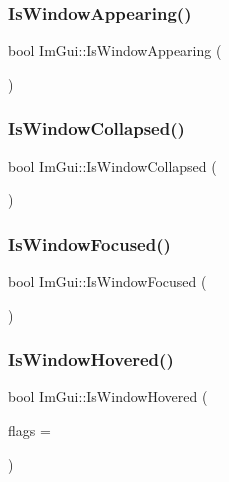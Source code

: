 \subsubsection{\texorpdfstring{Is\+Window\+Appearing()}{IsWindowAppearing()}}
{\footnotesize\ttfamily bool Im\+Gui\+::\+Is\+Window\+Appearing (\begin{DoxyParamCaption}{ }\end{DoxyParamCaption})}

\hypertarget{namespace_im_gui_a2a6492aea9013c0078fc530a66e11768}{}\label{namespace_im_gui_a2a6492aea9013c0078fc530a66e11768} 
\subsubsection{\texorpdfstring{Is\+Window\+Collapsed()}{IsWindowCollapsed()}}
{\footnotesize\ttfamily bool Im\+Gui\+::\+Is\+Window\+Collapsed (\begin{DoxyParamCaption}{ }\end{DoxyParamCaption})}

\hypertarget{namespace_im_gui_a1bc0d66039324e071c7d1ae20f9b1211}{}\label{namespace_im_gui_a1bc0d66039324e071c7d1ae20f9b1211} 
\subsubsection{\texorpdfstring{Is\+Window\+Focused()}{IsWindowFocused()}}
{\footnotesize\ttfamily bool Im\+Gui\+::\+Is\+Window\+Focused (\begin{DoxyParamCaption}{ }\end{DoxyParamCaption})}

\hypertarget{namespace_im_gui_aaed1ebf40cc2cb2ec30b0ba39b91d4a5}{}\label{namespace_im_gui_aaed1ebf40cc2cb2ec30b0ba39b91d4a5} 
\subsubsection{\texorpdfstring{Is\+Window\+Hovered()}{IsWindowHovered()}}
{\footnotesize\ttfamily bool Im\+Gui\+::\+Is\+Window\+Hovered (\begin{DoxyParamCaption}\item[{Im\+Gui\+Hovered\+Flags}]{flags = {} }\end{DoxyParamCaption})}

